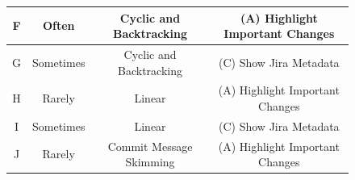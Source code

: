 \begin{landscape}
\begin{figure}
\begin{tabular}{@{}c|ccc@{}}
      F                       & Often                                                                                           & Cyclic and Backtracking                                                                & (A) Highlight Important Changes                                                               \\ \midrule
      G                       & Sometimes                                                                                       & Cyclic and Backtracking                                                                & (C) Show Jira Metadata                                                                        \\ \midrule
      H                       & Rarely                                                                                          & Linear                                                                                 & (A) Highlight Important Changes                                                               \\ \midrule
      I                       & Sometimes                                                                                       & Linear                                                                                 & (C) Show Jira Metadata                                                                        \\ \midrule
      J                       & Rarely                                                                                          & Commit Message Skimming                                                                & (A) Highlight Important Changes                                                               \\ \bottomrule
    \end{tabular}
    \label{tab:Flow-Chart-Tabular}
  \end{figure}
\end{landscape}

